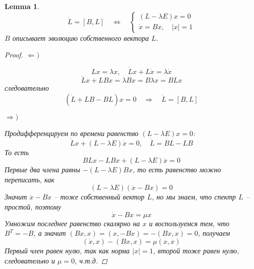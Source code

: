 \documentclass[a4paper,12pt]{article}
\newtheorem{lemma}{Lemma}
\theoremstyle{definition}
\theoremstyle{definition}
\theoremstyle{definition}
\begin{document}
\begin{lemma}
  \begin{equation}
    \label{eq:5}
      \dot{L}=[B,L] \quad\Longleftrightarrow\quad \left\{
          \begin{array}{l}
            (L-\lambda E)x=0\\
            \dot{x}=B x,\quad |x|=1
          \end{array}
          \right.
  \end{equation}
$B$ описывает эволюцию собственного вектора $L$.
\begin{proof}
  $\Leftarrow )$

  \begin{equation*}
    Lx=\lambda x, \quad \dot{L}x+L\dot{x}=\lambda\dot{x}
  \end{equation*}
  \begin{equation*}
    \dot{L}x+L B  x=\lambda B x = B\lambda x= BL x
  \end{equation*}
  следовательно
  \begin{equation*}
    (\dot{L}+LB-BL)x=0\quad\Rightarrow \quad \dot{L}=[B,L]
  \end{equation*}

  $\Rightarrow )$

  Продифференцируем по времени равенство $(L-\lambda E)x=0$:
  \begin{equation*}
    \dot{L}x+(L-\lambda E)\dot{x}=0, \quad \dot{L}=BL-LB
  \end{equation*}
  То есть
  \begin{equation*}
    BLx-LBx+(L-\lambda E)\dot{x}=0
  \end{equation*}
  Первые два члена равны $-(L-\lambda E)Bx$, то есть равенство можно переписать, как
  \begin{equation*}
    (L-\lambda E)(\dot x -Bx)=0
  \end{equation*}
  Значит $\dot x-Bx$ -- тоже собственный вектор $L$, но мы знаем, что спектр $L$ -- простой, поэтому
  \begin{equation*}
    \dot x -Bx= \mu x
  \end{equation*}
  Умножим последнее равенство скалярно на $x$ и воспользуемся тем, что $B^{T}=-B$, а значит $(Bx,x)=(x,-Bx)=-(Bx,x)=0$, получаем
  \begin{equation*}
    (\dot x, x)-(B x, x)=\mu(x,x)
  \end{equation*}
  Первый член равен нулю, так как норма $|x|=1$, второй тоже равен нулю, следовательно и $\mu=0$, ч.т.д.
\end{proof}
\end{lemma}
\end{document}
